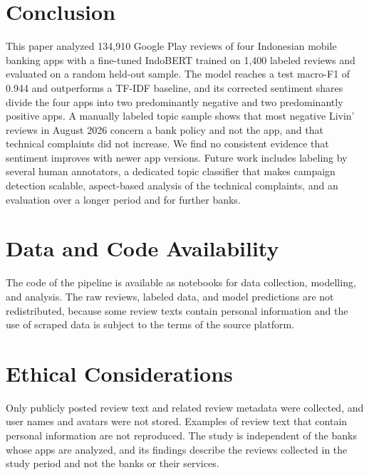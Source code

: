 \documentclass[conference]{IEEEtran}
\begin{document}
\section{Conclusion}\label{sec:conclusion}
This paper analyzed 134,910 Google Play reviews of four Indonesian mobile banking apps with a fine-tuned IndoBERT trained on 1,400 labeled reviews and evaluated on a random held-out sample. The model reaches a test macro-F1 of 0.944 and outperforms a TF-IDF baseline, and its corrected sentiment shares divide the four apps into two predominantly negative and two predominantly positive apps. A manually labeled topic sample shows that most negative Livin' reviews in August 2026 concern a bank policy and not the app, and that technical complaints did not increase. We find no consistent evidence that sentiment improves with newer app versions. Future work includes labeling by several human annotators, a dedicated topic classifier that makes campaign detection scalable, aspect-based analysis of the technical complaints, and an evaluation over a longer period and for further banks.

\section*{Data and Code Availability}
The code of the pipeline is available as notebooks for data collection, modelling, and analysis. The raw reviews, labeled data, and model predictions are not redistributed, because some review texts contain personal information and the use of scraped data is subject to the terms of the source platform.

\section*{Ethical Considerations}
Only publicly posted review text and related review metadata were collected, and user names and avatars were not stored. Examples of review text that contain personal information are not reproduced. The study is independent of the banks whose apps are analyzed, and its findings describe the reviews collected in the study period and not the banks or their services.
\end{document}
